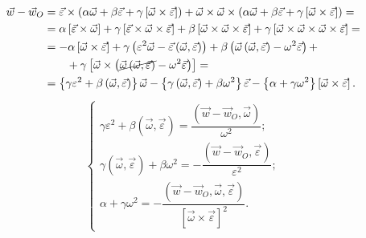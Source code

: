 \documentclass{weekly}
\begin{document}
\begin{align}
\begin{split}
    \vec w - \vec w_O &= \vec\varepsilon \times
            \left(\alpha \vec\omega + \beta \vec\varepsilon +
            \gamma \left[\vec\omega \times \vec\varepsilon\right]\right)
            + \vec\omega \times \vec\omega \times
            \left(\alpha \vec\omega + \beta \vec\varepsilon +
            \gamma \left[\vec\omega \times \vec\varepsilon\right]\right)
        =\\&= \alpha \left[\vec\varepsilon \times \vec\omega\right] +
            \gamma \left[\vec\varepsilon \times \vec\omega \times
            \vec\varepsilon\right] + \beta \left[\vec\omega \times
            \vec\omega \times \vec\varepsilon\right] +
            \gamma \left[\vec\omega \times \vec\omega \times \vec\omega
            \times\vec\varepsilon\right] =\\
        &= -\alpha \left[\vec\omega \times \vec\varepsilon\right] +
            \gamma \left(\varepsilon^2 \vec\omega - \vec\varepsilon
            \left(\vec\omega, \vec\varepsilon\right)\right) +
            \beta \left(\vec\omega \left(\vec\omega,
            \vec\varepsilon\right) - \omega^2\vec\varepsilon\right) +\\
        &\qquad+ \gamma\left[\vec\omega \times
            \left(\cancel{\vec\omega \left(\vec\omega,
            \vec\varepsilon\right)} -
            \omega^2\vec\varepsilon\right)\right] =\\
        &= \left\{\gamma\varepsilon^2 + \beta\left(\vec\omega,
            \vec\varepsilon\right)\right\} \vec\omega -
            \left\{\gamma\left(\vec\omega, \vec\varepsilon\right) +
            \beta\omega^2\right\} \vec\varepsilon -
            \left\{\alpha + \gamma\omega^2\right\} \left[\vec\omega
            \times \vec\varepsilon\right].
\end{split}
\end{align}
\begin{align}\tag*{$\blacktriangleleft$}
\begin{cases}
    \gamma\varepsilon^2 + \beta\left(\vec\omega, \vec\varepsilon\right)
        = \dfrac{\left(\vec w - \vec w_O, \vec\omega\right)}{\omega^2};
\\[2ex]
    \gamma\left(\vec\omega, \vec\varepsilon\right) + \beta\omega^2
        = -\dfrac{\left(\vec w - \vec w_O, \vec\varepsilon\right)}
            {\varepsilon^2};
\\[3ex]
    \alpha + \gamma\omega^2 =
        -\dfrac{\left(\vec w - \vec w_O, \vec\omega,
            \vec\varepsilon\right)}
            {\left[\vec\omega \times \vec\varepsilon\right]^2}.
\end{cases}
\end{align}
\end{document}
